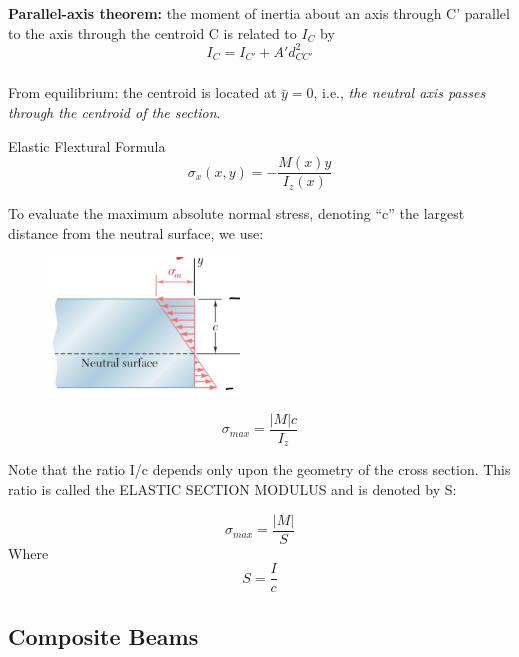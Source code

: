 \noindent \textbf{Parallel-axis theorem:} the moment of inertia about an axis through C’ parallel to the axis through the centroid C is related to $I_C$ by \[I_C = I_{C'} +A'd_{CC'}^2\]

\subsubsection{}
From equilibrium: the centroid is located at $\bar{y}=0$, i.e., \textit{the neutral axis passes through the centroid of the section}.

\vspace{5pt}

\noindent Elastic Flextural Formula \[\sigma_x (x,y) = - \frac{M(x)y}{I_z(x)}\]

\noindent {}

\blue{
\[M_z = \frac{EI_z}{\rho}\]
\[M_z = \frac{-\sigma_x}{y}I_z\]
}
\noindent {}

\noindent To evaluate the maximum absolute normal stress, denoting “c” the largest distance from the neutral surface, we use:

\begin{figure}[!h]
\centering
\includegraphics[angle=0, width=2in]{Bending-Figures/MaxStress.png}
\vspace{-2mm}
\caption{\small {}}
\vspace{-3mm}
\label{Fig:MaxStress}
\end{figure}

\[\sigma_{max} = \frac{|M|c}{I_z}\]

\noindent Note that the ratio I/c depends only upon the geometry of the cross section. This ratio is called the ELASTIC SECTION MODULUS and is denoted by S:

\[\sigma_{max} = \frac{|M|}{S}\]
Where \[S = \frac{I}{c}\]

\subsection{Composite Beams }

